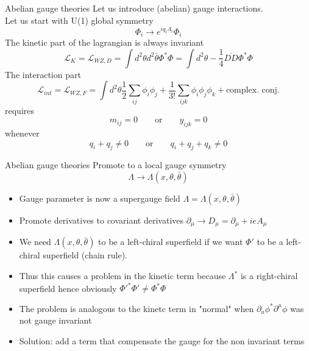 \documentclass[10pt]{beamer}
\begin{document}
\begin{frame}{Abelian gauge theories}
Let us introduce (abelian) gauge interactions. \\ 
Let us start with U(1) global symmetry 
\begin{equation*}
    \Phi_i \rightarrow e^{iq_i\Lambda_i}\Phi_i
\end{equation*}
The kinetic part of the lagrangian is always invariant
\begin{equation*}
    \mathcal{L}_{K} = \mathcal{L}_{WZ,D} = \int d^2\theta d^2 \bar\theta \Phi^*\Phi = \int d^2\theta -\frac{1}{4} \overline{D D} \Phi^*\Phi
\end{equation*}
The interaction part 
\begin{equation*}
    \mathcal{L}_{int} = \mathcal{L}_{WZ,F} = \int d^2\theta \frac{1}{2} \sum_{ij} \phi_i \phi_j + \frac{1}{3!} \sum_{ijk} \phi_i \phi_j \phi_k + \text{complex. conj.}
\end{equation*}
requires
\begin{equation*}
    m_{ij} = 0 \qquad \text{or} \qquad y_{ijk} = 0
\end{equation*}
whenever
\begin{equation*}
    q_i + q_j \neq 0 \qquad \text{or} \qquad q_i + q_j + q_k \neq 0
\end{equation*}
\end{frame}

\begin{frame}{Abelian gauge theories}
Promote to a local gauge symmetry
\begin{equation*}
    \Lambda \to \Lambda(x, \theta, \bar\theta)
\end{equation*}
\begin{itemize}
    \item Gauge parameter is now a supergauge field $\Lambda = \Lambda(x, \theta, \bar\theta)$
    \item Promote derivatives to covariant derivatives $\partial_\mu \to D_\mu = \partial_\mu + ieA_{\mu}$
    \item We need $\Lambda(x, \theta, \bar\theta)$ to be a left-chiral superfield if we want $\Phi'$ to be a left-chiral superfield (chain rule). \\ 
    \item Thus this causes a problem in the kinetic term because $\Lambda^*$ is a right-chiral superfield
    hence obviously $\Phi'^*\Phi' \neq \Phi^*\Phi$
    \item The problem is analogous to the kinetc term in "normal" when $\partial_u \phi^* \partial^\mu \phi$ was not gauge invariant
    \item Solution: add a term that compensate the gauge for the non invariant terms
\end{itemize}
\end{frame}
\end{document}
